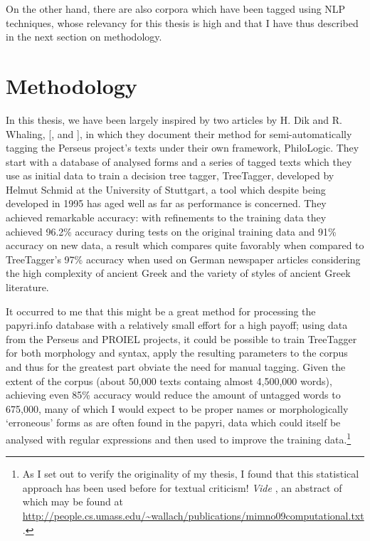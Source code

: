 On the other hand, there are also corpora which have been tagged using NLP
techniques, whose relevancy for this thesis is high and that I have thus
described in the next section on methodology.

\section{Methodology}

In this thesis, we have been largely inspired by two articles by H. Dik and R.
Whaling, [\citeauthor{dik2008}, \citeyear{dik2008} and \citeyear{dik2009}], in
which they document their method for semi-automatically tagging the Perseus
project's texts under their own framework, PhiloLogic. They start with a
database of analysed forms and a series of tagged texts which they use as
initial data to train a decision tree tagger, TreeTagger, developed by Helmut
Schmid at the University of Stuttgart, a tool which despite being developed in
1995 has aged well as far as performance is concerned. They achieved remarkable
accuracy: with refinements to the training data they achieved 96.2\% accuracy
during tests on the original training data and 91\% accuracy on new data, a
result which compares quite favorably when compared to TreeTagger's 97\%
accuracy when used on German newspaper articles considering the high complexity
of ancient Greek and the variety of styles of ancient Greek literature.

It occurred to me that this might be a great method for processing the
papyri.info database with a relatively small effort for a high payoff; using
data from the Perseus and PROIEL projects, it could be possible to train
TreeTagger for both morphology and syntax, apply the resulting parameters to
the corpus and thus for the greatest part obviate the need for manual tagging.
Given the extent of the corpus (about 50,000 texts containg almost 4,500,000
words), achieving even 85\% accuracy would reduce the amount of untagged words
to 675,000, many of which I would expect to be proper names or morphologically
`erroneous' forms as are often found in the papyri, data which could itself be
analysed with regular expressions and then used to improve the training
data.\footnote{As I set out to verify the originality of my thesis, I found
  that this statistical approach has been used before for textual criticism!
  \textit{Vide} \citet{mimno2009}, an abstract of which may be found at
  \url{http://people.cs.umass.edu/~wallach/publications/mimno09computational.txt}.}


